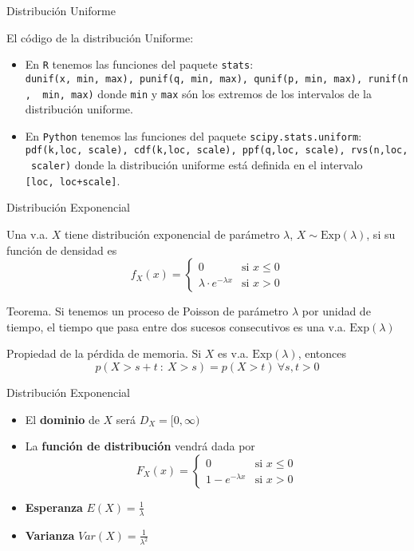 \documentclass[
  ignorenonframetext,
]{beamer}
\providecommand{\tightlist}{%
  \setlength{\itemsep}{0pt}\setlength{\parskip}{0pt}}
\begin{document}
\begin{frame}[fragile]{Distribución Uniforme}
\protect\hypertarget{distribuciuxf3n-uniforme-3}{}

El código de la distribución Uniforme:

\begin{itemize}
\tightlist
\item
  En \texttt{R} tenemos las funciones del paquete \texttt{stats}:
  \texttt{dunif(x,\ min,\ max),\ punif(q,\ min,\ max),\ qunif(p,\ min,\ max),\ runif(n,\ \ min,\ max)}
  donde \texttt{min} y \texttt{max} són los extremos de los intervalos
  de la distribución uniforme.
\item
  En \texttt{Python} tenemos las funciones del paquete
  \texttt{scipy.stats.uniform}:
  \texttt{pdf(k,loc,\ scale),\ cdf(k,loc,\ scale),\ ppf(q,loc,\ scale),\ rvs(n,loc,\ scaler)}
  donde la distribución uniforme está definida en el intervalo
  \texttt{{[}loc,\ loc+scale{]}}.
\end{itemize}

\end{frame}

\begin{frame}{Distribución Exponencial}
\protect\hypertarget{distribuciuxf3n-exponencial}{}

Una v.a. \(X\) tiene distribución exponencial de parámetro \(\lambda\),
\(X\sim\text{Exp}(\lambda)\), si su función de densidad es
\[f_X(x)=\left\{
\begin{array}{rl}
     0 & \text{si }  x\le 0
  \\ \lambda\cdot e^{-\lambda x} & \text{si }x>0
\end{array}
\right.\]

Teorema. Si tenemos un proceso de Poisson de parámetro \(\lambda\) por
unidad de tiempo, el tiempo que pasa entre dos sucesos consecutivos es
una v.a. \(\text{Exp}(\lambda)\)

Propiedad de la pérdida de memoria. Si \(X\) es v.a.
\(\text{Exp}(\lambda)\), entonces
\[p(X>s+t\ :\ X>s)=p(X>t)\ \forall s,t>0\]

\end{frame}

\begin{frame}{Distribución Exponencial}
\protect\hypertarget{distribuciuxf3n-exponencial-1}{}

\begin{itemize}
\item
  El \textbf{dominio} de \(X\) será \(D_X = [0,\infty)\)
\item
  La \textbf{función de distribución} vendrá dada por \[F_X(x)=\left\{
  \begin{array}{rl}
    0 & \text{si } x\le 0
  \\ 1-e^{-\lambda x} & \text{si } x>0
  \end{array}
  \right.\]
\item
  \textbf{Esperanza} \(E(X) = \frac{1}{\lambda}\)
\item
  \textbf{Varianza} \(Var(X) = \frac{1}{\lambda^2}\)
\end{itemize}

\end{frame}
\end{document}

